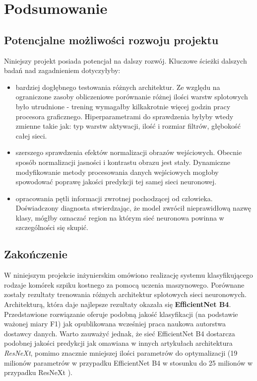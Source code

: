 \chapter{Podsumowanie}

\section{Potencjalne możliwości rozwoju projektu}

Niniejszy projekt posiada potencjał na dalszy rozwój. Kluczowe ścieżki dalszych badań nad zagadnieniem dotyczyłyby:
\begin{itemize}
\item bardziej dogłębnego testowania różnych architektur. Ze względu na ograniczone zasoby obliczeniowe porównanie różnej ilości warstw splotowych było utrudnione - trening wymagałby kilkakrotnie więcej godzin pracy procesora graficznego. Hiperparametrami do sprawdzenia byłyby wtedy zmienne takie jak: typ warstw aktywacji, ilość i rozmiar filtrów, głębokość całej sieci.
\item szerszego sprawdzenia efektów normalizacji obrazów wejściowych. Obecnie sposób normalizacji jasności i kontrastu obrazu jest stały. Dynamiczne modyfikowanie metody procesowania danych wejściowych mogłoby spowodować poprawę jakości predykcji tej samej sieci neuronowej.
\item opracowania pętli informacji zwrotnej pochodzącej od człowieka. Doświadczony diagnosta stwierdzając, że model zwrócił nieprawidłową nazwę klasy, mógłby oznaczać region na którym sieć neuronowa powinna w szczególności się skupić.
\end{itemize}

\section{Zakończenie}

W niniejszym projekcie inżynierskim omówiono realizację systemu klasyfikującego rodzaje komórek szpiku kostnego za pomocą uczenia maszynowego.
Porównane zostały rezultaty trenowania różnych architektur splotowych sieci neuronowych.
Architekturą, która daje najlepsze rezultaty okazała się \textbf{EfficientNet B4}.
Przedstawione rozwiązanie oferuje podobną jakość klasyfikacji (na podstawie ważonej miary F1) jak opublikowana wcześniej praca naukowa autorstwa dostawcy danych.
Warto zauważyć jednak, że sieć EfficientNet B4 dostarcza podobnej jakości predykcji jak omawiana w innych artykułach architektura \textit{ResNeXt}, pomimo znacznie mniejszej ilości parametrów do optymalizacji (19 milionów parametrów w przypadku EfficientNet B4 w stosunku do 25 milionów w przypadku ResNeXt \cite{resnext}).


